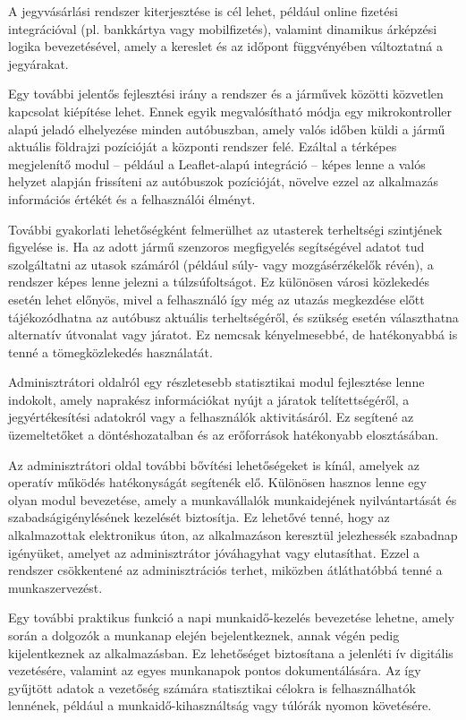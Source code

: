 A jegyvásárlási rendszer kiterjesztése is cél lehet, például online fizetési integrációval (pl. bankkártya vagy mobilfizetés), valamint dinamikus árképzési logika bevezetésével, amely a kereslet és az időpont függvényében változtatná a jegyárakat.

Egy további jelentős fejlesztési irány a rendszer és a járművek közötti közvetlen kapcsolat kiépítése lehet. Ennek egyik megvalósítható módja egy mikrokontroller alapú jeladó elhelyezése minden autóbuszban, amely valós időben küldi a jármű aktuális földrajzi pozícióját a központi rendszer felé. Ezáltal a térképes megjelenítő modul – például a Leaflet-alapú integráció – képes lenne a valós helyzet alapján frissíteni az autóbuszok pozícióját, növelve ezzel az alkalmazás információs értékét és a felhasználói élményt.

További gyakorlati lehetőségként felmerülhet az utasterek terheltségi szintjének figyelése is. Ha az adott jármű szenzoros megfigyelés segítségével adatot tud szolgáltatni az utasok számáról (például súly- vagy mozgásérzékelők révén), a rendszer képes lenne jelezni a túlzsúfoltságot. Ez különösen városi közlekedés esetén lehet előnyös, mivel a felhasználó így még az utazás megkezdése előtt tájékozódhatna az autóbusz aktuális terheltségéről, és szükség esetén választhatna alternatív útvonalat vagy járatot. Ez nemcsak kényelmesebbé, de hatékonyabbá is tenné a tömegközlekedés használatát.


Adminisztrátori oldalról egy részletesebb statisztikai modul fejlesztése lenne indokolt, amely naprakész információkat nyújt a járatok telítettségéről, a jegyértékesítési adatokról vagy a felhasználók aktivitásáról. Ez segítené az üzemeltetőket a döntéshozatalban és az erőforrások hatékonyabb elosztásában.

Az adminisztrátori oldal további bővítési lehetőségeket is kínál, amelyek az operatív működés hatékonyságát segítenék elő. Különösen hasznos lenne egy olyan modul bevezetése, amely a munkavállalók munkaidejének nyilvántartását és szabadságigénylésének kezelését biztosítja. Ez lehetővé tenné, hogy az alkalmazottak elektronikus úton, az alkalmazáson keresztül jelezhessék szabadnap igényüket, amelyet az adminisztrátor jóváhagyhat vagy elutasíthat. Ezzel a rendszer csökkentené az adminisztrációs terhet, miközben átláthatóbbá tenné a munkaszervezést.

Egy további praktikus funkció a napi munkaidő-kezelés bevezetése lehetne, amely során a dolgozók a munkanap elején bejelentkeznek, annak végén pedig kijelentkeznek az alkalmazásban. Ez lehetőséget biztosítana a jelenléti ív digitális vezetésére, valamint az egyes munkanapok pontos dokumentálására. Az így gyűjtött adatok a vezetőség számára statisztikai célokra is felhasználhatók lennének, például a munkaidő-kihasználtság vagy túlórák nyomon követésére.


